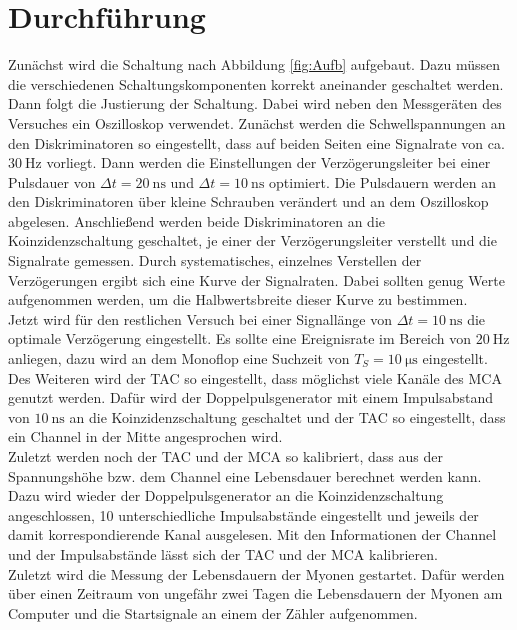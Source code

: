 \section{Durchführung}
	
	Zunächst wird die Schaltung nach Abbildung \ref{fig:Aufb} aufgebaut. 
    Dazu müssen die verschiedenen Schaltungskomponenten korrekt aneinander geschaltet werden.\\
	Dann folgt die Justierung der Schaltung. Dabei wird neben den Messgeräten des Versuches ein Oszilloskop verwendet.
	Zunächst werden die Schwellspannungen an den Diskriminatoren so eingestellt, dass auf beiden Seiten eine Signalrate von ca. $\SI{30}{\hertz}$ vorliegt. 
    Dann werden die Einstellungen der Verzögerungsleiter bei einer Pulsdauer von $\Delta t= \SI{20}{\nano\second}$ und $\Delta t= \SI{10}{\nano\second}$ optimiert.
	Die Pulsdauern werden an den Diskriminatoren über kleine Schrauben verändert und an dem Oszilloskop abgelesen.
	Anschließend werden beide Diskriminatoren an die Koinzidenzschaltung geschaltet, je einer der Verzögerungsleiter verstellt und die Signalrate gemessen.
	Durch systematisches, einzelnes Verstellen der Verzögerungen ergibt sich eine Kurve der Signalraten. 
    Dabei sollten genug Werte aufgenommen werden, um die Halbwertsbreite dieser Kurve zu bestimmen.\\
	Jetzt wird für den restlichen Versuch bei einer Signallänge von $\Delta t= \SI{10}{\nano\second}$ die optimale Verzögerung eingestellt.
    Es sollte eine Ereignisrate im Bereich von $\SI{20}{\hertz}$ anliegen, dazu wird an dem Monoflop eine Suchzeit von $T_S = \SI{10}{\micro\second}$ eingestellt.\\
	Des Weiteren wird der TAC so eingestellt, dass möglichst viele Kanäle des MCA genutzt werden.
	Dafür wird der Doppelpulsgenerator mit einem Impulsabstand von $\SI{10}{\nano\second}$ an die Koinzidenzschaltung geschaltet und der TAC so eingestellt, dass ein Channel in der Mitte angesprochen wird.\\
	Zuletzt werden noch der TAC und der MCA so kalibriert, dass aus der Spannungshöhe bzw. dem Channel eine Lebensdauer berechnet werden kann.
	Dazu wird wieder der Doppelpulsgenerator an die Koinzidenzschaltung angeschlossen, 10 unterschiedliche Impulsabstände eingestellt und jeweils der damit korrespondierende Kanal ausgelesen.
	Mit den Informationen der Channel und der Impulsabstände lässt sich der TAC und der MCA kalibrieren.\\
    Zuletzt wird die Messung der Lebensdauern der Myonen gestartet. 
    Dafür werden über einen Zeitraum von ungefähr zwei Tagen die Lebensdauern der Myonen am Computer und die Startsignale an einem der Zähler aufgenommen.
